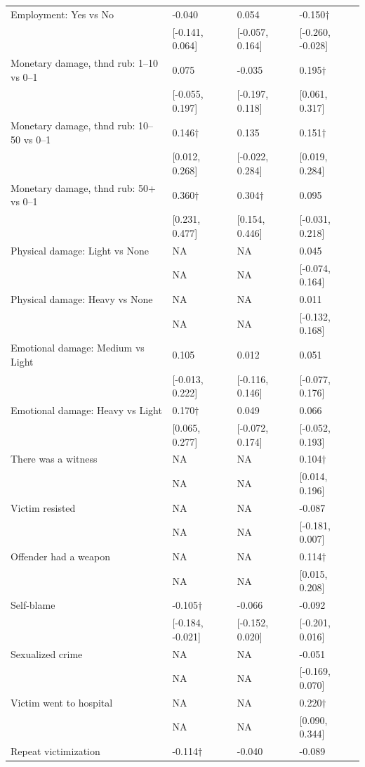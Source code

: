 \begin{tabular}[t]{llll}
Employment: Yes vs No & -0.040 & 0.054 & -0.150$\dagger$\\
 & {}[-0.141, 0.064] & {}[-0.057, 0.164] & {}[-0.260, -0.028]\\
Monetary damage, thnd rub:  1–10 vs 0–1 & 0.075 & -0.035 & 0.195$\dagger$\\
 & {}[-0.055, 0.197] & {}[-0.197, 0.118] & {}[0.061, 0.317]\\
Monetary damage, thnd rub:  10–50 vs 0–1 & 0.146$\dagger$ & 0.135 & 0.151$\dagger$\\
 & {}[0.012, 0.268] & {}[-0.022, 0.284] & {}[0.019, 0.284]\\
Monetary damage, thnd rub:  50+ vs 0–1 & 0.360$\dagger$ & 0.304$\dagger$ & 0.095\\
 & {}[0.231, 0.477] & {}[0.154, 0.446] & {}[-0.031, 0.218]\\
Physical damage: Light vs None & NA & NA & 0.045\\
 & NA & NA & {}[-0.074, 0.164]\\
Physical damage: Heavy vs None & NA & NA & 0.011\\
 & NA & NA & {}[-0.132, 0.168]\\
Emotional damage: Medium vs Light & 0.105 & 0.012 & 0.051\\
 & {}[-0.013, 0.222] & {}[-0.116, 0.146] & {}[-0.077, 0.176]\\
Emotional damage: Heavy vs Light & 0.170$\dagger$ & 0.049 & 0.066\\
 & {}[0.065, 0.277] & {}[-0.072, 0.174] & {}[-0.052, 0.193]\\
There was a witness & NA & NA & 0.104$\dagger$\\
 & NA & NA & {}[0.014, 0.196]\\
Victim resisted & NA & NA & -0.087\\
 & NA & NA & {}[-0.181, 0.007]\\
Offender had a weapon & NA & NA & 0.114$\dagger$\\
 & NA & NA & {}[0.015, 0.208]\\
Self-blame & -0.105$\dagger$ & -0.066 & -0.092\\
 & {}[-0.184, -0.021] & {}[-0.152, 0.020] & {}[-0.201, 0.016]\\
Sexualized crime & NA & NA & -0.051\\
 & NA & NA & {}[-0.169, 0.070]\\
Victim went to hospital & NA & NA & 0.220$\dagger$\\
 & NA & NA & {}[0.090, 0.344]\\
Repeat victimization & -0.114$\dagger$ & -0.040 & -0.089\\

\end{tabular}

